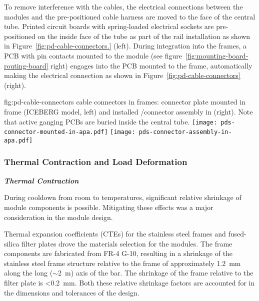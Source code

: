 To remove interference with the  cables, the electrical connections between the  modules and the pre-positioned cable harness are moved to the face of the central  tube.  Printed circuit boards with spring-loaded electrical sockets are pre-positioned on the inside face of the tube as part of the  rail installation as shown in Figure~\ref{fig:pd-cable-connectors.} (left).  During  integration into the  frames, a PCB with pin contacts mounted to the  module (see figure~\ref{fig:mounting-board-routing-board} right) engages into the PCB mounted to the  frame, automatically making the electrical connection as shown in 
Figure~\ref{fig:pd-cable-connectors} (right).


\begin{dunefigure}{fig:pd-cable-connectors}
{ cable connectors in  frames:  connector plate mounted in  frame (ICEBERG model, left) and installed /connector assembly in  (right).  Note that active ganging PCBs are buried inside the central tube.}
	\texttt{[image: pds-connector-mounted-in-apa.pdf]}
	\texttt{[image: pds-connector-assembly-in-apa.pdf]}
\end{dunefigure}

\subsubsection{Thermal Contraction and Load Deformation}

\textit{\bf Thermal Contraction}

During cooldown from room 
to  temperatures,  significant relative shrinkage of module components is possible.  Mitigating these effects was a major consideration in the  module design.

Thermal expansion coefficients (CTEs) for the stainless steel  frames and fused-silica filter plates drove the materials selection for the  modules.  The frame components are fabricated from FR-4 G-10, resulting in a shrinkage of the stainless steel frame structure relative to the frame of approximately \SI{1.2}{mm} along the long ($\sim$\SI{2}{m}) axis of the bar.  The shrinkage of the frame relative to the filter plate is <\SI{0.2}{mm}.  Both these relative shrinkage factors are accounted for in the dimensions and tolerances of the design.

